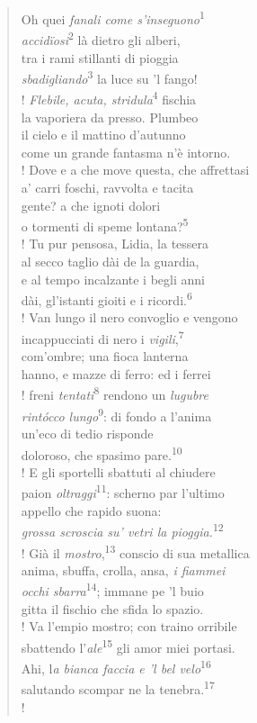 \documentclass{book}
\begin{document}
\begin{verse}
Oh quei \textit{fanali come s’inseguono}\textsuperscript{1}\\
\textit{accidïosi}\textsuperscript{2} là dietro gli alberi,\\
tra i rami stillanti di pioggia\\
\textit{sbadigliando}\textsuperscript{3} la luce su ’l fango!\\!
\textit{Flebile, acuta, stridula}\textsuperscript{4} fischia\\
la vaporiera da presso. Plumbeo\\
il cielo e il mattino d’autunno\\
come un grande fantasma n’è intorno.\\!
Dove e a che move questa, che affrettasi\\
a’ carri foschi, ravvolta e tacita\\
gente? a che ignoti dolori\\
o tormenti di speme lontana?\textsuperscript{5}\\!
Tu pur pensosa, Lidia, la tessera\\
al secco taglio dài de la guardia,\\
e al tempo incalzante i begli anni\\
dài, gl’istanti gioiti e i ricordi.\textsuperscript{6}\\!
Van lungo il nero convoglio e vengono\\
incappucciati di nero i \textit{vigili},\textsuperscript{7}\\
com’ombre; una fioca lanterna\\
hanno, e mazze di ferro: ed i ferrei\\!
freni \textit{tentati}\textsuperscript{8} rendono un \textit{lugubre}\\
\textit{rintócco lungo}\textsuperscript{9}: di fondo a l’anima\\
un’eco di tedio risponde\\
doloroso, che spasimo pare.\textsuperscript{10}\\!
E gli sportelli sbattuti al chiudere\\
paion \textit{oltraggi}\textsuperscript{11}: scherno par l’ultimo\\
appello che rapido suona:\\
\textit{grossa scroscia su’ vetri la pioggia.}\textsuperscript{12}\\!
Già il \textit{mostro},\textsuperscript{13} conscio di sua metallica\\
anima, sbuffa, crolla, ansa, \textit{i fiammei}\\
\textit{occhi sbarra}\textsuperscript{14}; immane pe ’l buio\\
gitta il fischio che sfida lo spazio.\\!
Va l’empio mostro; con traino orribile\\
sbattendo l’\textit{ale}\textsuperscript{15} gli amor miei portasi.\\
Ahi, l\textit{a bianca faccia e ’l bel velo}\textsuperscript{16}\\
salutando scompar ne la tenebra.\textsuperscript{17}\\!
\end{verse}
\end{document}
